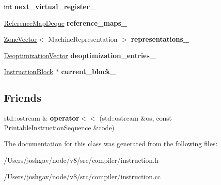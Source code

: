 \begin{DoxyCompactItemize}
\item 
int {\bfseries next\+\_\+virtual\+\_\+register\+\_\+}\hypertarget{classv8_1_1internal_1_1compiler_1_1_instruction_sequence_a78b44305dcccbac5fc6e71aa8ffb2a7f}{}\label{classv8_1_1internal_1_1compiler_1_1_instruction_sequence_a78b44305dcccbac5fc6e71aa8ffb2a7f}

\item 
\hyperlink{classv8_1_1internal_1_1_zone_deque}{Reference\+Map\+Deque} {\bfseries reference\+\_\+maps\+\_\+}\hypertarget{classv8_1_1internal_1_1compiler_1_1_instruction_sequence_a15eb9410707dbffaaf09cb2c88345681}{}\label{classv8_1_1internal_1_1compiler_1_1_instruction_sequence_a15eb9410707dbffaaf09cb2c88345681}

\item 
\hyperlink{classv8_1_1internal_1_1_zone_vector}{Zone\+Vector}$<$ Machine\+Representation $>$ {\bfseries representations\+\_\+}\hypertarget{classv8_1_1internal_1_1compiler_1_1_instruction_sequence_a3e3f17bd6be5a9eb6a644861b46e6a30}{}\label{classv8_1_1internal_1_1compiler_1_1_instruction_sequence_a3e3f17bd6be5a9eb6a644861b46e6a30}

\item 
\hyperlink{classv8_1_1internal_1_1_zone_vector}{Deoptimization\+Vector} {\bfseries deoptimization\+\_\+entries\+\_\+}\hypertarget{classv8_1_1internal_1_1compiler_1_1_instruction_sequence_a651b33c5300e1fdd717a78629750b7e8}{}\label{classv8_1_1internal_1_1compiler_1_1_instruction_sequence_a651b33c5300e1fdd717a78629750b7e8}

\item 
\hyperlink{classv8_1_1internal_1_1compiler_1_1_instruction_block}{Instruction\+Block} $\ast$ {\bfseries current\+\_\+block\+\_\+}\hypertarget{classv8_1_1internal_1_1compiler_1_1_instruction_sequence_a56a97186874846b66d2070a2e028b8c9}{}\label{classv8_1_1internal_1_1compiler_1_1_instruction_sequence_a56a97186874846b66d2070a2e028b8c9}

\end{DoxyCompactItemize}
\subsection*{Friends}
\begin{DoxyCompactItemize}
\item 
std\+::ostream \& {\bfseries operator$<$$<$} (std\+::ostream \&os, const \hyperlink{structv8_1_1internal_1_1compiler_1_1_printable_instruction_sequence}{Printable\+Instruction\+Sequence} \&code)\hypertarget{classv8_1_1internal_1_1compiler_1_1_instruction_sequence_a04380668f11f1db5f3e83914fe6a383a}{}\label{classv8_1_1internal_1_1compiler_1_1_instruction_sequence_a04380668f11f1db5f3e83914fe6a383a}

\end{DoxyCompactItemize}


The documentation for this class was generated from the following files\+:\begin{DoxyCompactItemize}
\item 
/\+Users/joshgav/node/v8/src/compiler/instruction.\+h\item 
/\+Users/joshgav/node/v8/src/compiler/instruction.\+cc\end{DoxyCompactItemize}
